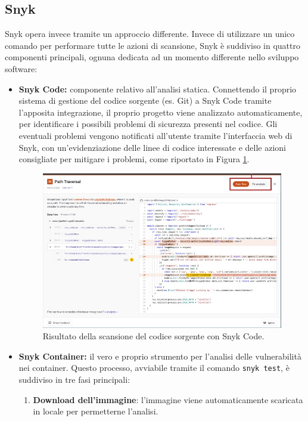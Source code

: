 \subsection{Snyk}
Snyk opera invece tramite un approccio differente\cite{snyk_docs}. Invece di utilizzare un unico comando per performare tutte le azioni di scansione, Snyk è suddiviso in quattro componenti principali, ognuna dedicata ad un momento differente nello sviluppo software:
\begin{itemize}
   \item \textbf{Snyk Code:} componente relativo all'analisi statica. Connettendo il proprio sistema di gestione del codice sorgente (es. Git) a Snyk Code tramite l'apposita integrazione, il proprio progetto viene analizzato automaticamente, per identificare i possibili problemi di sicurezza presenti nel codice. Gli eventuali problemi vengono notificati all'utente tramite l'interfaccia web di Snyk, con un'evidenziazione delle linee di codice interessate e delle azioni consigliate per mitigare i problemi, come riportato in Figura \ref{fig:snyk_code}.
         \begin{figure}[H]
            \centering
            \includegraphics[width=1\textwidth]{immagini/capitolo1/snyk_code.jpg}
            \caption{Risultato della scansione del codice sorgente con Snyk Code.}
            \label{fig:snyk_code}
         \end{figure}
   \item \textbf{Snyk Container:} il vero e proprio strumento per l'analisi delle vulnerabilità nei container. Questo processo, avviabile tramite il comando \texttt{snyk test}, è suddiviso in tre fasi principali:
         \begin{enumerate}
            \item \textbf{Download dell'immagine}: l'immagine viene automaticamente scaricata in locale per permetterne l'analisi.

\end{enumerate}
\end{itemize}
